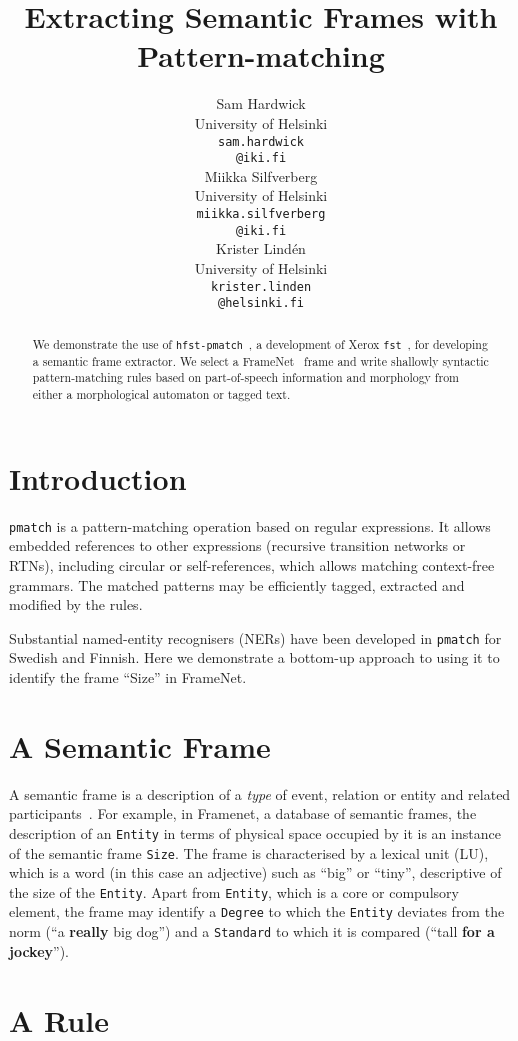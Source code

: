 \documentclass[11pt]{article}
\title{Extracting Semantic Frames with Pattern-matching}
\author{Sam Hardwick \\
  University of Helsinki \\
  {\tt sam.hardwick} \\ {\tt @iki.fi} \\\And
  Miikka Silfverberg \\
  University of Helsinki \\
  {\tt miikka.silfverberg} \\ {\tt @iki.fi}\\\And
  Krister Lind{é}n \\
  University of Helsinki \\
  {\tt krister.linden} \\ {\tt @helsinki.fi}}
\date{}
\begin{document}
\maketitle
\begin{abstract}
  We demonstrate the use of \verb+hfst-pmatch+~, a development of Xerox
  \verb+fst+~, for developing a semantic frame extractor. We
  select a FrameNet~ frame and write shallowly syntactic pattern-matching rules
  based on part-of-speech information and morphology from either a morphological automaton or
  tagged text.
\end{abstract}

\section{Introduction}
\verb+pmatch+ is a pattern-matching operation based on regular expressions. It
allows embedded references to other expressions (recursive transition networks
or RTNs), including circular or self-references, which allows matching
context-free grammars. The matched patterns may be efficiently tagged, extracted
and modified by the rules.

Substantial named-entity recognisers (NERs) have been developed in
\verb+pmatch+ for Swedish and Finnish. Here we demonstrate a bottom-up approach
to using it to identify the frame ``Size'' in FrameNet.

\section{A Semantic Frame}

A semantic frame is a description of a \emph{type} of event, relation or entity
and related participants~. For example, in Framenet,
a database of semantic frames,
the description of an \verb+Entity+ in terms of physical space occupied by it is
an instance of the semantic frame \verb+Size+. The frame is characterised by
a lexical unit (LU), which is a word (in this case an adjective)
such as ``big'' or ``tiny'', descriptive of the size of the \verb+Entity+.
Apart from \verb+Entity+, which is a core or compulsory element, the
frame may identify a \verb+Degree+ to which the \verb+Entity+ deviates
from the norm (``a \textbf{really} big dog'') and a \verb+Standard+ to
which it is compared (``tall \textbf{for a jockey}'').

\section{A Rule}
\end{document}
